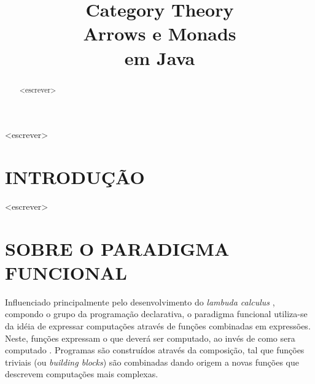 \documentclass[10pt, conference]{IEEEtran}
\begin{document}
\title { 
	Category Theory \\
	Arrows e Monads \\
	em Java 
}

\author{


	\and	
	
}
					  
\maketitle

\begin{abstract}

<escrever>

\end{abstract}

\begin{IEEEkeywords}

<escrever>

\end{IEEEkeywords}

\section{INTRODUÇÃO}
\label{sec:intro}

<escrever>

\section{SOBRE O PARADIGMA FUNCIONAL}
\label{sec:func-para}
Influenciado principalmente pelo desenvolvimento do \textit{lambuda calculus} \cite{hudak1989conception}, compondo o grupo da programação declarativa, o paradigma funcional utiliza-se da idéia de expressar computações através de funções combinadas em expressões. Neste, funções expressam o que deverá ser computado, ao invés de como sera computado \cite{louden2011programming}. Programas são construídos através da composição, tal que funções triviais (ou \textit{building blocks}) são combinadas dando origem a novas funções que descrevem computações mais complexas.
\end{document}
